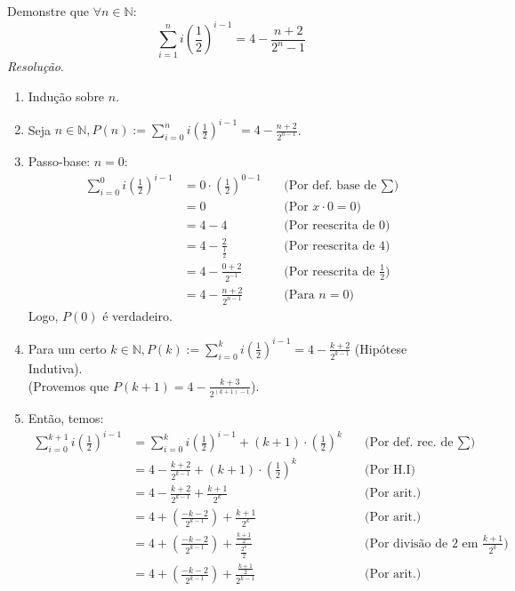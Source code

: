 Demonstre que $\forall n \in \mathbb{N}$:
\begin{displaymath}
	\sum\limits_{i = 1}^n i(\frac{1}{2})^{i - 1} = 4 - \frac{n + 2}{2^n - 1}
\end{displaymath}
\emph{Resolução}.
\begin{enumerate}
	\item Indução sobre $n$.
	\item Seja $n \in \mathbb{N}, P(n) := \sum\limits_{i = 0}^n i(\frac{1}{2})^{i - 1} = 4 - \frac{n + 2}{2^{n - 1}}$.
	\item Passo-base: $n = 0$:
	\begin{align*}
		\sum\limits_{i = 0}^0 i(\frac{1}{2})^{i - 1} &= 0 \cdot (\frac{1}{2})^{0 - 1} &\quad \text{(Por def. base de $\sum$)} \\
		&= 0 &\quad \text{(Por $x \cdot 0 = 0$)} \\
		&= 4 - 4 &\quad \text{(Por reescrita de 0)} \\
		&= 4 - \frac{2}{\frac{1}{2}} &\quad \text{(Por reescrita de 4)} \\
		&= 4 - \frac{0 + 2}{2^{-1}} &\quad \text{(Por reescrita de $\frac{1}{2}$)} \\
		&= 4 - \frac{n + 2}{2^{n - 1}} &\quad \text{(Para $n = 0$)}
	\end{align*}
	Logo, $P(0)$ é verdadeiro.
	\item Para um certo $k \in \mathbb{N}, P(k) := \sum\limits_{i = 0}^k i(\frac{1}{2})^{i - 1} = 4 - \frac{k + 2}{2^{k - 1}}$ (Hipótese Indutiva). \\
	(Provemos que $P(k + 1) = 4 - \frac{k + 3}{2^{(k + 1) - 1}}$). \\
	\item Então, temos:
	\begin{align*}
		\sum\limits_{i = 0}^{k + 1} i(\frac{1}{2})^{i - 1} &= \sum\limits_{i = 0}^k i(\frac{1}{2})^{i - 1} + (k + 1)\cdot(\frac{1}{2})^k &\quad \text{(Por def. rec. de $\sum$)} \\
		&= 4 - \frac{k + 2}{2^{k - 1}} + (k + 1) \cdot(\frac{1}{2})^k &\quad \text{(Por H.I)} \\
		&= 4 - \frac{k + 2}{2^{k - 1}} + \frac{k + 1}{2^k} &\quad \text{(Por arit.)} \\
		&= 4 + (\frac{-k - 2}{2^{k - 1}}) + \frac{k + 1}{2^k} &\quad \text{(Por arit.)} \\
		&= 4 + (\frac{-k - 2}{2^{k - 1}}) + \frac{\frac{k + 1}{2}}{\frac{2^k}{2}} &\quad \text{(Por divisão de $2$ em $\frac{k + 1}{2^k}$)} \\
		&= 4 + (\frac{-k - 2}{2^{k - 1}}) + \frac{\frac{k + 1}{2}}{2^{k - 1}} &\quad \text{(Por arit.)} \\

\end{align*}
\end{enumerate}
